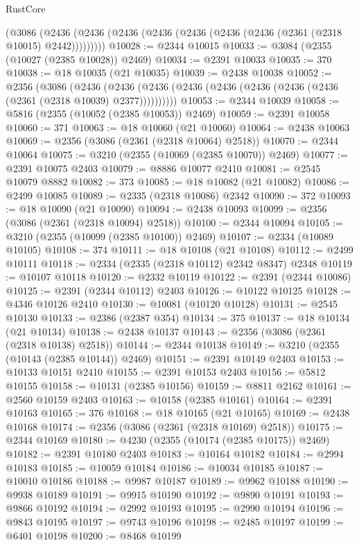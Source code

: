 \begin{lexlean}{RustCore}
\begin{coremodule}
    (@3086 (@2436 (@2436 (@2436 (@2436 (@2436 (@2436 (@2436 (@2361 (@2318 @10015) @2442)))))))))
@10028 := @2344 @10015
@10033 := @3084 (@2355 (@10027 (@2385 @10028)) @2469)
@10034 := @2391 @10033
@10035 := 370
@10038 := @18 @10035 (@21 @10035)
@10039 := @2438 @10038
@10052 := @2356
    (@3086
      (@2436 (@2436 (@2436 (@2436 (@2436 (@2436 (@2436 (@2436 (@2361 (@2318 @10039) @2377))))))))))
@10053 := @2344 @10039
@10058 := @5816 (@2355 (@10052 (@2385 @10053)) @2469)
@10059 := @2391 @10058
@10060 := 371
@10063 := @18 @10060 (@21 @10060)
@10064 := @2438 @10063
@10069 := @2356 (@3086 (@2361 (@2318 @10064) @2518))
@10070 := @2344 @10064
@10075 := @3210 (@2355 (@10069 (@2385 @10070)) @2469)
@10077 := @2391 @10075 @2403
@10079 := @8886 @10077 @2410
@10081 := @2545 @10079 @8882
@10082 := 373
@10085 := @18 @10082 (@21 @10082)
@10086 := @2499 @10085
@10089 := @2335 (@2318 @10086) @2342
@10090 := 372
@10093 := @18 @10090 (@21 @10090)
@10094 := @2438 @10093
@10099 := @2356 (@3086 (@2361 (@2318 @10094) @2518))
@10100 := @2344 @10094
@10105 := @3210 (@2355 (@10099 (@2385 @10100)) @2469)
@10107 := @2334 (@10089 @10105)
@10108 := 374
@10111 := @18 @10108 (@21 @10108)
@10112 := @2499 @10111
@10118 := @2334 (@2335 (@2318 @10112) @2342 @8347) @2348
@10119 := @10107 @10118
@10120 := @2332 @10119
@10122 := @2391 (@2344 @10086)
@10125 := @2391 (@2344 @10112) @2403
@10126 := @10122 @10125
@10128 := @4346 @10126 @2410
@10130 := @10081 (@10120 @10128)
@10131 := @2545 @10130
@10133 := @2386 (@2387 @354)
@10134 := 375
@10137 := @18 @10134 (@21 @10134)
@10138 := @2438 @10137
@10143 := @2356 (@3086 (@2361 (@2318 @10138) @2518))
@10144 := @2344 @10138
@10149 := @3210 (@2355 (@10143 (@2385 @10144)) @2469)
@10151 := @2391 @10149 @2403
@10153 := @10133 @10151 @2410
@10155 := @2391 @10153 @2403
@10156 := @5812 @10155
@10158 := @10131 (@2385 @10156)
@10159 := @8811 @2162
@10161 := @2560 @10159 @2403
@10163 := @10158 (@2385 @10161)
@10164 := @2391 @10163
@10165 := 376
@10168 := @18 @10165 (@21 @10165)
@10169 := @2438 @10168
@10174 := @2356 (@3086 (@2361 (@2318 @10169) @2518))
@10175 := @2344 @10169
@10180 := @4230 (@2355 (@10174 (@2385 @10175)) @2469)
@10182 := @2391 @10180 @2403
@10183 := @10164 @10182
@10184 := @2994 @10183
@10185 := @10059 @10184
@10186 := @10034 @10185
@10187 := @10010 @10186
@10188 := @9987 @10187
@10189 := @9962 @10188
@10190 := @9938 @10189
@10191 := @9915 @10190
@10192 := @9890 @10191
@10193 := @9866 @10192
@10194 := @2992 @10193
@10195 := @2990 @10194
@10196 := @9843 @10195
@10197 := @9743 @10196
@10198 := @2485 @10197
@10199 := @6401 @10198
@10200 := @8468 @10199

\end{coremodule}
\end{lexlean}
